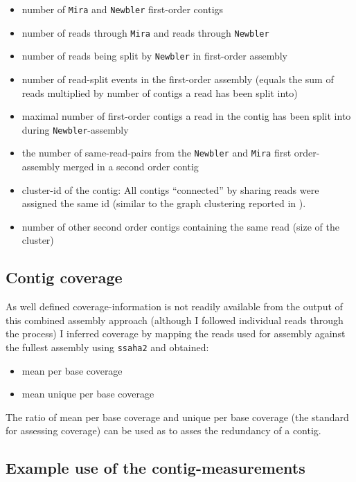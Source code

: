 \begin{itemize}
\item number of \texttt{Mira} and \texttt{Newbler} first-order contigs
\item number of reads through \texttt{Mira} and reads through \texttt{Newbler}
\item number of reads being split by \texttt{Newbler} in first-order
  assembly 
\item number of read-split events in the first-order assembly (equals
  the sum of reads multiplied by number of contigs a read has been
  split into)
\item maximal number of first-order contigs a read in the contig has
  been split into during \texttt{Newbler}-assembly 
\item the number of same-read-pairs from the \texttt{Newbler} and
  \texttt{Mira} first order-assembly merged in a second order contig
\item cluster-id of the contig: All contigs ``connected'' by sharing
  reads were assigned the same id (similar to the graph clustering
  reported in \cite{pmid21138572}).
\item number of other second order contigs containing the same read
  (size of the cluster)
\end{itemize}


\subsection{Contig coverage}

As well defined coverage-information is not readily available from the
output of this combined assembly approach (although I followed
individual reads through the process) I inferred coverage by mapping
the reads used for assembly against the fullest assembly using
\texttt{ssaha2} \cite{pmid11591649} and obtained:

\begin{itemize}
\item mean per base coverage
\item mean unique per base coverage
\end{itemize}

The ratio of mean per base coverage and unique per base coverage (the
standard for assessing coverage) can be used as to asses the redundancy
of a contig.

\subsection{Example use of the contig-measurements}

